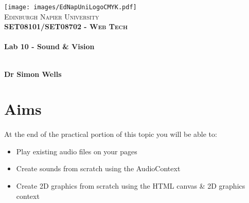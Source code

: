 \documentclass[10pt, a4paper]{article}
\begin{document}

\begin{titlepage}
\vspace*{5cm}
\begin{center}
\texttt{[image: images/EdNapUniLogoCMYK.pdf]}~\\[1cm]

\textsc{\Large Edinburgh Napier University}\\[1.5cm]

\textsc{\LARGE \bfseries SET08101/SET08702 - Web Tech}\\[0.5cm]

\hrulefill \\[0.4cm]
{\huge \bfseries Lab 10 - Sound \& Vision \\[0.4cm] }
\hrulefill \\[1.5cm]

\begin{minipage}{0.4\textwidth}
\begin{flushleft} \large
\textbf{Dr Simon Wells} \\
\end{flushleft}
\end{minipage}

\vfill

\end{center}
\end{titlepage}




%

\section{Aims}
\paragraph{} At the end of the practical portion of this topic you will be able to:

\begin{itemize}
\item Play existing audio files on your pages
\item Create sounds from scratch using the AudioContext
\item Create 2D graphics from scratch using the HTML canvas \& 2D graphics context
\end{itemize}
\end{document}
